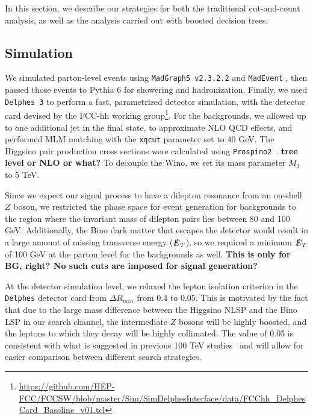 \documentclass[a4paper,11pt]{article}
\newcommand{\Shufang}[1]{{\bf\color{Maroon}  #1}}
\newcommand{\met}{{\slashed{E}_T}}
\begin{document}
In this section, we  describe our strategies for both the traditional
cut-and-count analysis, as well as the analysis carried out with boosted
decision trees. 

\subsection{Simulation}\label{simulation}

We simulated parton-level events using \texttt{MadGraph5 v2.3.2.2} and
\texttt{MadEvent} \cite{Alwall:2014hca}, then passed those events to Pythia 6
\cite{Sjostrand:2006za} for showering and hadronization. Finally, we used
\texttt{Delphes 3} \cite{deFavereau:2013fsa} to perform a fast, parametrized
detector simulation, with the detector card devised by the FCC-hh working
group\footnote{\url{https://github.com/HEP-FCC/FCCSW/blob/master/Sim/SimDelphesInterface/data/FCChh_DelphesCard_Baseline_v01.tcl}}.
For the backgrounds, we allowed up to one additional jet in the final state, to
approximate NLO QCD effects, and performed MLM matching with the \texttt{xqcut}
parameter set to 40 GeV. The Higgsino pair production cross sections were
calculated using \texttt{Prospino2}~\cite{Beenakker:1999xh}. \Shufang{tree level or NLO or what?}  To decouple the
Wino, we set its mass parameter $M_2$ to 5 TeV.  

Since we expect our signal process to have a dilepton resonance from an on-shell
$Z$ boson, we restricted the phase space for event generation for backgrounds to
the region where the invariant mass of dilepton pairs lies between 80 and 100
GeV. Additionally, the Bino dark matter that escapes the detector would result
in a large amount of missing transverse energy ($\met$), so we required
a minimum $\met$ of 100 GeV at the parton level for the backgrounds as
well.  \Shufang{This is only for BG, right?  No such cuts are imposed for signal generation?}

At the detector simulation level, we relaxed the lepton isolation criterion in the
\texttt{Delphes} detector card from $\Delta R_{min}$ from 0.4 to 0.05. This is
motivated by the fact that due to the large mass difference between the Higgsino
NLSP and the Bino LSP in our search channel, the intermediate $Z$ bosons will be
highly boosted, and the leptons to which they decay will be highly collimated.
The value of 0.05 is consistent with what is suggested in previous 100 TeV
studies~\cite{Acharya:2014pua,Gori:2014oua,Bramante:2014tba} and will allow
for easier comparison between different search strategies.   
\end{document}
